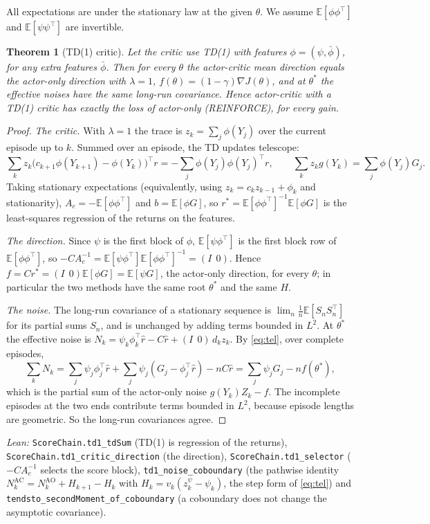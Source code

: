 \documentclass[11pt]{article}
\newtheorem{theorem}{Theorem}[section]
\theoremstyle{definition}
\theoremstyle{remark}
\newcommand{\E}{\mathbb{E}}
\begin{document}
All expectations are under the stationary law at the given $\theta$. We assume $\E[\phi\phi^\top]$ and
$\E[\psi\psi^\top]$ are invertible.

\begin{theorem}[TD(1) critic]\label{thm:td1}
Let the critic use TD(1) with features $\phi = (\psi, \bar\phi)$, for any extra features $\bar\phi$.
Then for every $\theta$ the actor-critic mean direction equals the actor-only direction with
$\lambda = 1$, $f(\theta) = (1-\gamma)\nabla J(\theta)$, and at $\theta^*$ the effective noises have the same
long-run covariance. Hence actor-critic with a TD(1) critic has exactly the loss of actor-only
(REINFORCE), for every gain.
\end{theorem}
\begin{proof}
\emph{The critic.} With $\lambda = 1$ the trace is $z_k = \sum_j\phi(Y_j)$ over the current episode up
to $k$. Summed over an episode, the TD updates telescope:
\begin{equation}\label{eq:tel}
  \sum_kz_k\big(c_{k+1}\phi(Y_{k+1}) - \phi(Y_k)\big)^\top r = -\sum_j\phi(Y_j)\phi(Y_j)^\top r,\qquad
  \sum_kz_kg(Y_k) = \sum_j\phi(Y_j)G_j .
\end{equation}
Taking stationary expectations (equivalently, using $z_k = c_kz_{k-1} + \phi_k$ and
stationarity), $A_c = -\E[\phi\phi^\top]$ and $b = \E[\phi G]$, so $r^* = \E[\phi\phi^\top]^{-1}\E[\phi G]$ is
the least-squares regression of the returns on the features.

\emph{The direction.} Since $\psi$ is the first block of $\phi$, $\E[\psi\phi^\top]$ is the first block
row of $\E[\phi\phi^\top]$, so $-CA_c^{-1} = \E[\psi\phi^\top]\E[\phi\phi^\top]^{-1} = (I\;\,0)$. Hence
$f = Cr^* = (I\;\,0)\E[\phi G] = \E[\psi G]$, the actor-only direction, for every $\theta$; in particular
the two methods have the same root $\theta^*$ and the same $H$.

\emph{The noise.} The long-run covariance of a stationary sequence is $\lim_n\frac1n\E[S_nS_n^\top]$
for its partial sums $S_n$, and is unchanged by adding terms bounded in $L^2$. At $\theta^*$ the effective
noise is $N_k = \psi_k\phi_k^\top\hat r - C\hat r + (I\;\,0)\,d_kz_k$. By \eqref{eq:tel}, over complete
episodes,
\[
  \sum_kN_k = \sum_j\psi_j\phi_j^\top\hat r + \sum_j\psi_j(G_j - \phi_j^\top\hat r) - nC\hat r
  = \sum_j\psi_jG_j - nf(\theta^*),
\]
which is the partial sum of the actor-only noise $g(Y_k)Z_k - f$. The incomplete episodes at the two
ends contribute terms bounded in $L^2$, because episode lengths are geometric. So the long-run
covariances agree.
\end{proof}
\noindent\emph{Lean:} \texttt{ScoreChain.td1\_tdSum} (TD(1) is regression of the returns),
\texttt{ScoreChain.td1\_critic\_direction} (the direction), \texttt{ScoreChain.td1\_selector}
($-CA_c^{-1}$ selects the score block), \texttt{td1\_noise\_coboundary} (the pathwise identity
$N^{\mathrm{AC}}_k = N^{\mathrm{AO}}_k + H_{k+1} - H_k$ with $H_k = v_k(z^\psi_k - \psi_k)$, the step form of
\eqref{eq:tel}) and \texttt{tendsto\_secondMoment\_of\_coboundary} (a coboundary does not change the
asymptotic covariance).
\end{document}
